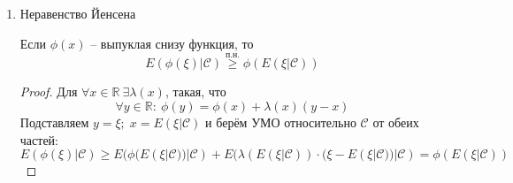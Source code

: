 \begin{enumerate}
\begin{proof}
		      Если $\eta$ -- произвольная ,то приближаем простыми и пользуемся предельным переходом.
	      \end{proof}
	\item Неравенство Йенсена

	      Если $\phi(x)$ -- выпуклая снизу функция, то
	      \[E(\phi(\xi) | \mathcal{C}) \stackrel{\text{п.н.}}{\geq} \phi(E(\xi | \mathcal{C}))\]
	      \begin{proof}
		      Для $\forall x \in \mathbb{R} \: \exists \lambda(x)$, такая, что \[\forall y \in \mathbb{R} :\: \phi(y) = \phi(x) + \lambda(x)(y - x)\]
		      Подставляем $y = \xi;\; x = E(\xi | \mathcal{C})$ и берём УМО относительно $\mathcal{C}$ от обеих частей:
		      \[E(\phi(\xi) | \mathcal{C}) \geq E(\phi(E(\xi | \mathcal{C})) | \mathcal{C}) + E(\lambda(E(\xi | \mathcal{C})) \cdot (\xi - E(\xi | \mathcal{C})) | \mathcal{C}) = \phi(E(\xi | \mathcal{C}))\]
	      \end{proof}
\end{enumerate}
